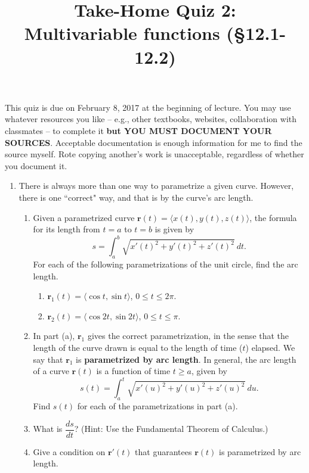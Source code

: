 \documentclass[%
]{article}
\title{\vspace{-3.5pc} 
	\flushleft \bf \Large Take-Home Quiz 2: \\ Multivariable functions (\S 12.1-12.2)}
\date{}
\newcommand{\vect}[1]{\mathbf{#1}}
\begin{document}
\maketitle

\vspace{-3pc}
 This quiz is due on February 8, 2017 at the beginning of lecture.  You may use whatever resources you like -- e.g., other textbooks, websites, collaboration with classmates -- to complete it \textbf{but YOU MUST DOCUMENT YOUR SOURCES}.  Acceptable documentation is enough information for me to find the source myself.  Rote copying another's work is unacceptable, regardless of whether you document it.  

\noindent\hrulefill

\begin{enumerate}
\item %
There is always more than one way to parametrize a given curve.  However, there is one ``correct" way, and that is by the curve's arc length.
\begin{enumerate}
	\item Given a parametrized curve $\vect r(t)=\langle x(t),y(t),z(t)\rangle$, the formula for its length from $t=a$ to $t=b$ is given by
	\[
	s=\int_a^b\sqrt{x'(t)^2+y'(t)^2+z'(t)^2}\ dt.
	\] 
	For each of the following parametrizations of the unit circle, find the arc length.
	\begin{enumerate}
		\item $\vect r_1(t)=\langle \cos t,\sin t\rangle$, $0\leq t\leq 2\pi$.
		\item $\vect r_2(t)=\langle \cos{2t},\sin{2t}\rangle$, $0\leq t\leq \pi$.
	\end{enumerate}
	\item In part (a), $\vect r_1$ gives the correct parametrization, in the sense that the length of the curve drawn is equal to the length of time ($t$) elapsed.  We say that $\vect r_1$ is \textbf{parametrized by arc length}.  In general, the arc length of a curve $\vect r(t)$  is a function of time $t\geq a$, given by
	\[
	s(t)=\int_a^t\sqrt{x'(u)^2+y'(u)^2+z'(u)^2}\ du.
	\]  
	Find $s(t)$ for each of the parametrizations in part (a).
	\item What is $\dfrac{ds}{dt}$? (Hint: Use the Fundamental Theorem of Calculus.)
	\item Give a condition on $\vect r'(t)$ that guarantees $\vect r(t)$ is parametrized by arc length.
\end{enumerate}


\end{enumerate}
\end{document}
